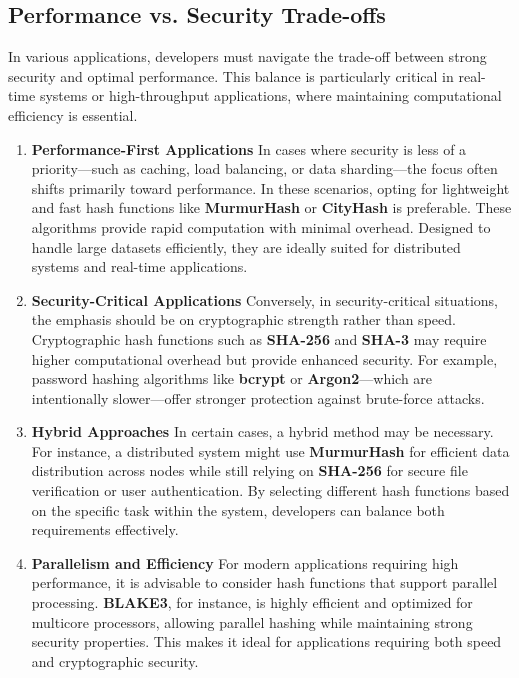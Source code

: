 \documentclass[11pt,a4paper]{article}
\begin{document}
    \subsection*{Performance vs. Security Trade-offs}
    In various applications, developers must navigate the trade-off between strong security and optimal performance. This balance is particularly critical in real-time systems or high-throughput applications, where maintaining computational efficiency is essential.
        \begin{enumerate}
            \item \textbf{Performance-First Applications}
            \newline
            In cases where security is less of a priority—such as caching, load balancing, or data sharding—the focus often shifts primarily toward performance. In these scenarios, opting for lightweight and fast hash functions like \textbf{MurmurHash} or \textbf{CityHash} is preferable. These algorithms provide rapid computation with minimal overhead. Designed to handle large datasets efficiently, they are ideally suited for distributed systems and real-time applications.

            \item \textbf{Security-Critical Applications}
            \newline
            Conversely, in security-critical situations, the emphasis should be on cryptographic strength rather than speed. Cryptographic hash functions such as \textbf{SHA-256} and \textbf{SHA-3} may require higher computational overhead but provide enhanced security. For example, password hashing algorithms like \textbf{bcrypt} or \textbf{Argon2}—which are intentionally slower—offer stronger protection against brute-force attacks.

            \item \textbf{Hybrid Approaches}
            \newline
            In certain cases, a hybrid method may be necessary. For instance, a distributed system might use \textbf{MurmurHash} for efficient data distribution across nodes while still relying on \textbf{SHA-256} for secure file verification or user authentication. By selecting different hash functions based on the specific task within the system, developers can balance both requirements effectively.

            \item \textbf{Parallelism and Efficiency}
            \newline
            For modern applications requiring high performance, it is advisable to consider hash functions that support parallel processing. \textbf{BLAKE3}, for instance, is highly efficient and optimized for multicore processors, allowing parallel hashing while maintaining strong security properties. This makes it ideal for applications requiring both speed and cryptographic security.

        \end{enumerate}
\end{document}
